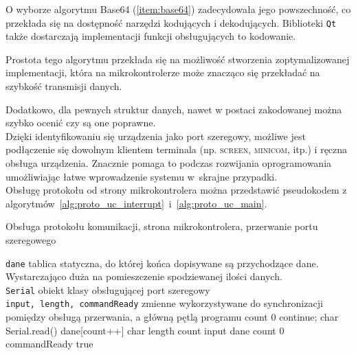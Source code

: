 O wyborze algorytmu Base64 (\ref{item:base64}) zadecydowała jego powszechność, co przekłada się na dostępność narzędzi kodujących i dekodujących.
Biblioteki \texttt{Qt} także dostarczają implementacji funkcji obsługujących to kodowanie.

Prostota tego algorytmu przekłada się na możliwość stworzenia zoptymalizowanej implementacji, która na mikrokontrolerze może znacząco się przekładać na szybkość transmisji danych.

Dodatkowo, dla pewnych struktur danych, nawet w postaci zakodowanej można szybko ocenić czy są one poprawne.\\

Dzięki identyfikowaniu się urządzenia jako port szeregowy, możliwe jest podłączenie się dowolnym klientem terminala (np. \textsc{screen}, \textsc{minicom}, itp.) i ręczna obsługa urządzenia.
Znacznie pomaga to podczas rozwijania oprogramowania umożliwiając łatwe wprowadzenie systemu w~skrajne przypadki.\\

Obsługę protokołu od strony mikrokontrolera można przedstawić pseudokodem z algorytmów~\ref{alg:proto_uc_interrupt}~i~\ref{alg:proto_uc_main}.
\begin{algorithm}
\caption{Obsługa protokołu komunikacji, strona mikrokontrolera, przerwanie portu szeregowego}
\label{alg:proto_uc_interrupt}
\begin{algorithmic}[1]
  \REQUIRE \texttt{dane} \ppauza tablica statyczna, do której końca dopisywane są przychodzące dane. Wystarczająco duża na pomieszczenie spodziewanej ilości danych.\\
  \texttt{Serial} \ppauza obiekt klasy obsługującej port szeregowy\\
  \texttt{input, length, commandReady} \ppauza zmienne wykorzystywane do synchronizacji pomiędzy obsługą przerwania, a główną pętlą programu
  \STATE count \textleftarrow{} $0$
      \STATE continue;
    \ENDIF
    \STATE char \textleftarrow{} Serial.read()
    \STATE dane[count++] \textleftarrow{} char
      \STATE length \textleftarrow{} count
      \STATE input \textleftarrow{} dane
      \STATE count \textleftarrow{} $0$
      \STATE commandReady \textleftarrow{} true
    \ENDIF
  \ENDWHILE
\end{algorithmic}
\end{algorithm}

